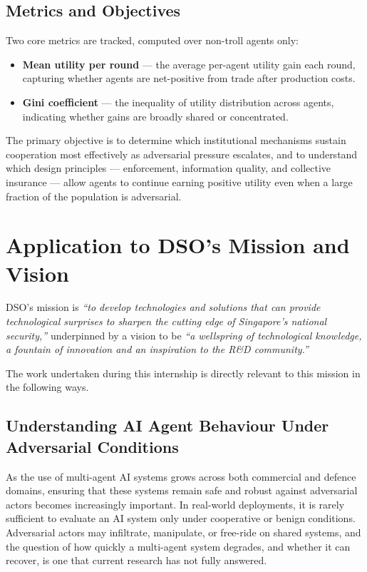 \documentclass[12pt,a4paper]{article}
\begin{document}
\subsection*{Metrics and Objectives}

Two core metrics are tracked, computed over non-troll agents only:

\begin{itemize}
    \item \textbf{Mean utility per round} --- the average per-agent utility gain each round, capturing whether agents are net-positive from trade after production costs.
    \item \textbf{Gini coefficient} --- the inequality of utility distribution across agents, indicating whether gains are broadly shared or concentrated.
\end{itemize}

The primary objective is to determine which institutional mechanisms sustain cooperation most effectively as adversarial pressure escalates, and to understand which design principles --- enforcement, information quality, and collective insurance --- allow agents to continue earning positive utility even when a large fraction of the population is adversarial.



\section{Application to DSO's Mission and Vision}

DSO's mission is \textit{``to develop technologies and solutions that can provide technological surprises to sharpen the cutting edge of Singapore's national security,''} underpinned by a vision to be \textit{``a wellspring of technological knowledge, a fountain of innovation and an inspiration to the R\&D community.''}

The work undertaken during this internship is directly relevant to this mission in the following ways.

\subsection*{Understanding AI Agent Behaviour Under Adversarial Conditions}

As the use of multi-agent AI systems grows across both commercial and defence domains, ensuring that these systems remain safe and robust against adversarial actors becomes increasingly important. In real-world deployments, it is rarely sufficient to evaluate an AI system only under cooperative or benign conditions. Adversarial actors may infiltrate, manipulate, or free-ride on shared systems, and the question of how quickly a multi-agent system degrades, and whether it can recover, is one that current research has not fully answered.
\end{document}
